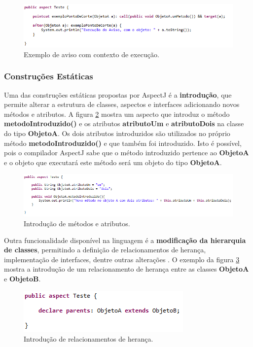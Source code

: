 \begin{figure}[!hb]
	\centering
	\includegraphics{img/advice_code.png}
	\caption{Exemplo de aviso com contexto de execução.}\label{fig:advice_code}
\end{figure}

\subsubsection{Construções Estáticas}


Uma das construções estáticas propostas por AspectJ é a \textbf{introdução}, que
permite alterar a estrutura de classes, aspectos e interfaces adicionando novos
métodos e atributos. A figura \ref{fig:introduction} mostra um aspecto que
introduz o método \textbf{metodoIntroduzido()} e os atributos
\textbf{atributoUm} e \textbf{atributoDois} na classe do tipo \textbf{ObjetoA}.
Os dois atributos introduzidos são utilizados no próprio método
\textbf{metodoIntroduzido()} e que também foi introduzido. Isto é possível, pois
o compilador AspectJ sabe que o método introduzido pertence ao \textbf{ObjetoA}
e o objeto que executará este método será um objeto do tipo \textbf{ObjetoA}.

\begin{figure}
	\centering
	\includegraphics[scale=0.9]{img/introduction.png}
	\caption{Introdução de métodos e atributos.}\label{fig:introduction}
\end{figure}

Outra funcionalidade disponível na linguagem é a \textbf{modificação da hierarquia de classes}, permitindo a definição de
relacionamentos de herança, implementação de interfaces, dentre outras
alterações \cite{Laddad:2003:AAP:993468}. O exemplo da figura
\ref{fig:introduction_interface} mostra a introdução de um relacionamento de
herança entre as classes \textbf{ObjetoA} e \textbf{ObjetoB}.

\begin{figure}
	\centering
	\includegraphics{img/introduction_interface.png}
	\caption{Introdução de relacionamentos de
	herança.}\label{fig:introduction_interface}
\end{figure}

